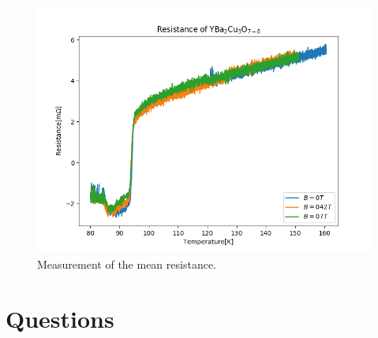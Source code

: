 \documentclass[a4paper,parskip,11pt, DIV12]{scrreprt}
\begin{document}
\begin{figure}[H]
\centering
\includegraphics[scale=0.5]{Widerstand}
\caption[]{Measurement of the mean resistance.}
\end{figure}

\section{Questions}
\end{document}
